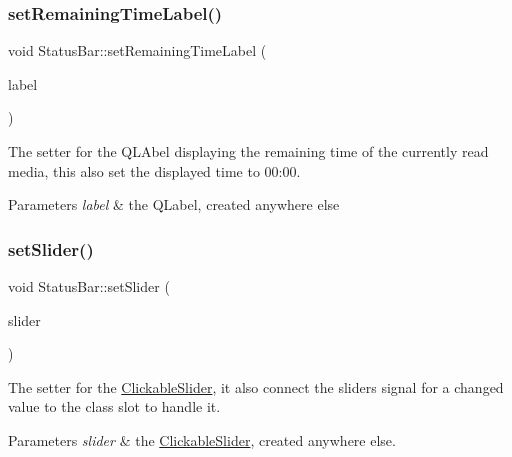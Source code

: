 \subsubsection{\texorpdfstring{set\+Remaining\+Time\+Label()}{setRemainingTimeLabel()}}
{\footnotesize\ttfamily void Status\+Bar\+::set\+Remaining\+Time\+Label (\begin{DoxyParamCaption}\item[{Q\+Label $\ast$}]{label }\end{DoxyParamCaption})}



The setter for the Q\+L\+Abel displaying the remaining time of the currently read media, this also set the displayed time to 00\+:00. 


\begin{DoxyParams}{Parameters}
{\em label} & the Q\+Label, created anywhere else \\
\hline
\end{DoxyParams}
\mbox{\label{classStatusBar_aec9c453a499cd3737f7dd24903aae133}} 
\subsubsection{\texorpdfstring{set\+Slider()}{setSlider()}}
{\footnotesize\ttfamily void Status\+Bar\+::set\+Slider (\begin{DoxyParamCaption}\item[{\hyperlink{classClickableSlider}{Clickable\+Slider} $\ast$}]{slider }\end{DoxyParamCaption})}



The setter for the \hyperlink{classClickableSlider}{Clickable\+Slider}, it also connect the slider\textquotesingle{}s signal for a changed value to the class slot to handle it. 


\begin{DoxyParams}{Parameters}
{\em slider} & the \hyperlink{classClickableSlider}{Clickable\+Slider}, created anywhere else. \\
\hline
\end{DoxyParams}
\mbox{\label{classStatusBar_a58be568ef32791d26f2d45063189c4af}} 
